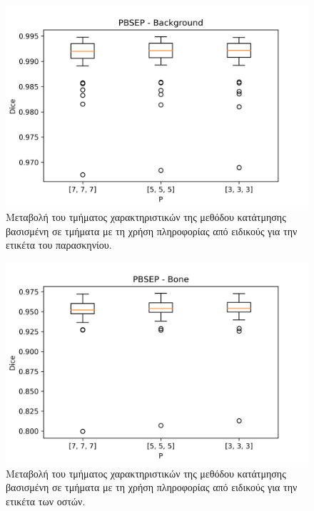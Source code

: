 \documentclass[a4paper,12pt]{article}
\begin{document}
\begin{figure}[H]
    \centering
    \includegraphics[width=0.85\linewidth]{PBSEP_P_Background_plot.png}
    \caption{Μεταβολή του τμήματος χαρακτηριστικών της μεθόδου κατάτμησης
             βασισμένη σε τμήματα με τη χρήση πληροφορίας από ειδικούς για την
             ετικέτα του παρασκηνίου.}
    \label{fig:PBSEP:P:1}
\end{figure}

\begin{figure}[H]
    \centering
    \includegraphics[width=0.85\linewidth]{PBSEP_P_Bone_plot.png}
    \caption{Μεταβολή του τμήματος χαρακτηριστικών της μεθόδου κατάτμησης
             βασισμένη σε τμήματα με τη χρήση πληροφορίας από ειδικούς για την
             ετικέτα των οστών.}
    \label{fig:PBSEP:P:2}
\end{figure}
\end{document}
